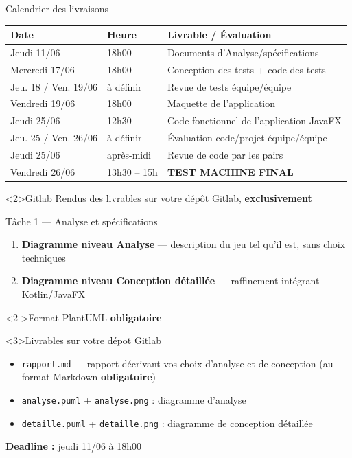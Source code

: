 \documentclass[french,10pt,dvipsnames,table]{beamer}%
\begin{document}
\begin{frame}{Calendrier des livraisons}
  \begin{center}
  \footnotesize
  \begin{tabular}{lll}
    \hline
    \textbf{Date} & \textbf{Heure} & \textbf{Livrable / Évaluation} \\
    \hline
    Jeudi 11/06    & 18h00          & Documents d'Analyse/spécifications \\
    Mercredi 17/06 & 18h00          & Conception des tests + code des tests \\
    Jeu. 18 / Ven. 19/06 & à définir & Revue de tests équipe/équipe \\
    Vendredi 19/06 & 18h00          & Maquette de l'application \\
    Jeudi 25/06    & 12h30          & Code fonctionnel de l'application JavaFX \\
    Jeu. 25 / Ven. 26/06 & à définir & Évaluation code/projet équipe/équipe \\
    Jeudi 25/06    & après-midi     & Revue de code par les pairs \\
    Vendredi 26/06 & 13h30 – 15h   & \textbf{TEST MACHINE FINAL} \\
    \hline
  \end{tabular}
  \end{center}
  \bigskip
  \begin{alertblock}<2>{Gitlab}
    Rendus des livrables sur votre dépôt Gitlab, \textbf{exclusivement}
  \end{alertblock}
\end{frame}

\begin{frame}{Tâche 1 — Analyse et spécifications}
    \begin{enumerate}
      \item \textbf{Diagramme niveau Analyse} — description du jeu tel qu'il est, sans choix techniques
      \item \textbf{Diagramme niveau Conception détaillée} — raffinement intégrant Kotlin/JavaFX
    \end{enumerate}
 
  \begin{alertblock}<2->{Format PlantUML}
    \textbf{obligatoire} 
  \end{alertblock}
  \begin{exampleblock}<3>{Livrables sur votre dépot Gitlab}
    \begin{itemize}
      \item \texttt{rapport.md} — rapport décrivant vos choix d'analyse et de conception (au format Markdown \textbf{obligatoire})
      \item \texttt{analyse.puml} + \texttt{analyse.png} : diagramme d'analyse
      \item \texttt{detaille.puml} + \texttt{detaille.png} : diagramme de conception détaillée
    \end{itemize}
  \end{exampleblock}
  \textbf{Deadline :} jeudi 11/06 à 18h00
\end{frame}
\end{document}
